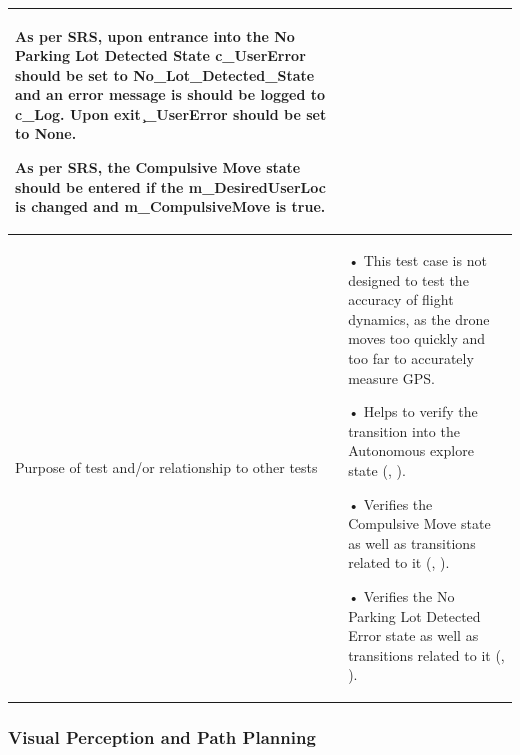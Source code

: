\documentclass[12pt, titlepage]{article}
\begin{document}
\begin{table}[!h]
\begin{center}
\begin{tabular}{ | m{1.5cm} | m{15cm} | }
As per SRS, upon entrance into the No Parking Lot Detected State c\_UserError should be set to No_Lot_Detected_State and an error message is should be logged to c\_Log. Upon exit \c_UserError should be set to None.

As per SRS, the Compulsive Move state should be entered if the m\_DesiredUserLoc is changed and m\_CompulsiveMove is true. 
 \\ 
\hline
Purpose of test and/or relationship to other tests & 
• This test case is not designed to test the accuracy of flight dynamics, as the drone moves too quickly and too far to accurately measure GPS.

• Helps to verify the transition into the Autonomous explore state (\nameref{STA_003}, \nameref{TRANS_004}). 

• Verifies the Compulsive Move state as well as transitions related to it (\nameref{STA_011}, \nameref{TRANS_012}).

• Verifies the No Parking Lot Detected Error state as well as transitions related to it (\nameref{STA_008}, \nameref{TRANS_008}).
\\ 
\hline
\end{tabular}
\end{center}
\end{table}

\clearpage

\subsubsection{Visual Perception and Path Planning}
\end{document}
